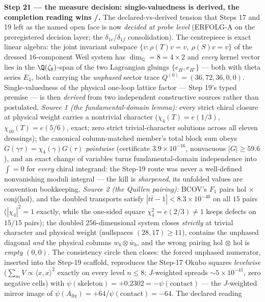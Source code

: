 \par\smallskip\noindent\textbf{Step 21 --- the measure decision: single-valuedness is derived,
the completion reading wins \mE/\mC.} The declared-vs-derived tension that Steps 17 and 19 left
as the named open face is now \emph{decided at probe level} (ERFOLG-A on the preregistered
decision layer; the $\delta_{1e}$/$\delta_{1f}$ consolidation). The centrepiece is exact linear
algebra: the joint invariant subspace $\{v:\rho(T)v=v,\ \rho(S)v=v\}$ of the dressed
$16$-component Weil system has $\dim_{\mathbb Q}=8=4\times2$ and \emph{every} kernel vector
lies in the $\Q(\zeta_8)$-span of the two Lagrangian gluings $\{e_H,e_{H'}\}$ --- both with
theta series $E_4$, both carrying the \emph{unphased} sector trace $Q^{(0)}=(36,72,36,0,0)$.
Single-valuedness of the physical one-loop lattice factor --- Step 19's typed premise --- is
then \emph{derived} from two independent constructive sources rather than postulated.
\emph{Source 1 (the fundamental-domain lemma):} every strict chiral closure at physical weight
carries a nontrivial character ($\chi_4(T)=e(1/3)$, $\chi_{10}(T)=e(5/6)$, exact; zero strict
trivial-character solutions across all eleven dressings); the canonical column-matched member's
total block sum obeys $G(\gamma\tau)=\chi_4(\gamma)G(\tau)$ \emph{pointwise} (certificate
$3.9\times10^{-16}$, nonvacuous $|G|\ge59.6$), and an exact change of variables turns
fundamental-domain independence into $\int=0$ for \emph{every} chiral integrand: the Step-19
route was never a well-defined nonvanishing moduli integral --- the kill is \emph{sharpened},
its unfolded values are convention bookkeeping. \emph{Source 2 (the Quillen pairing):} BCOV's
$F_1$ pairs hol$\,\times\,$conj(hol), and the doubled transports satisfy
$|t\bar t-1|<8.3\times10^{-40}$ on all $15$ pairs ($|\chi_4|^2=1$ exactly, while the one-sided
square $\chi_4^2=e(2/3)\neq1$ keeps defects on $15/15$ pairs); the doubled $256$-dimensional
system closes \emph{strictly} at trivial character and physical weight (nullspaces
$(28,17)\ge11$), contains the unphased diagonal \emph{and} the physical columns
$w_b\otimes\bar w_b$, and the wrong pairing hol$\,\otimes\,$hol is \emph{empty} $(0,0)$. The
consistency circle then closes: the forced unphased numerator, inserted into the Step-19
scaffold, reproduces the Step-17 Okubo squares \emph{levelwise} ($\sum_mV\propto\langle
x,x\rangle^2$ exactly on every level $n\le8$; $J$-weighted spreads $\sim5\times10^{-41}$, zero
negative cells) with $\psi(\text{skeleton})=+0.2302=-\psi(\text{contact})$ --- the $J$-weighted
mirror image of $\psi(A_{\mathrm{fix}})=+64$/$\psi(\text{contact})=-64$. The declared reading
